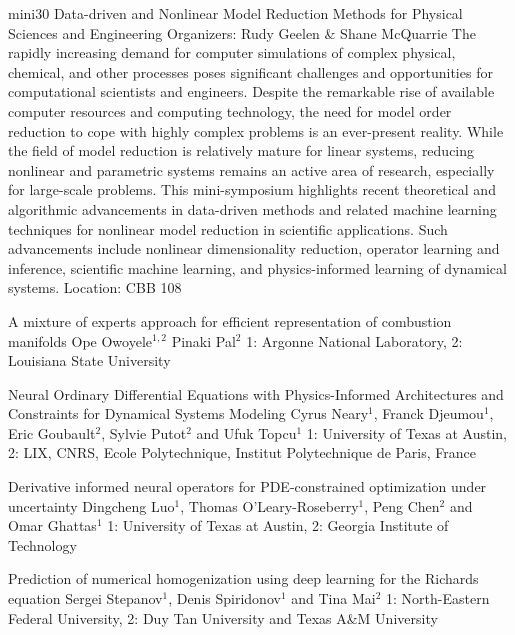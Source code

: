\mini
{mini30}
{Data-driven and Nonlinear Model Reduction Methods for Physical Sciences and Engineering}
{Organizers: Rudy Geelen \& Shane McQuarrie}
{The rapidly increasing demand for computer simulations of complex physical, chemical, and other processes poses significant challenges and opportunities for computational scientists and engineers. Despite the remarkable rise of available computer resources and computing technology, the need for model order reduction to cope with highly complex problems is an ever-present reality. While the field of model reduction is relatively mature for linear systems, reducing nonlinear and parametric systems remains an active area of research, especially for large-scale problems. This mini-symposium highlights recent theoretical and algorithmic advancements in data-driven methods and related machine learning techniques for nonlinear model reduction in scientific applications. Such advancements include nonlinear dimensionality reduction, operator learning and inference, scientific machine learning, and physics-informed learning of dynamical systems.}
{Location: CBB 108}

\begin{talks}
\item\talk
{A mixture of experts approach for efficient representation of combustion manifolds}
{Ope Owoyele$^{1,2}$ Pinaki Pal$^2$}
{1: Argonne National Laboratory, 2: Louisiana State University}
\item\talk
{Neural Ordinary Differential Equations with Physics-Informed Architectures and Constraints for Dynamical Systems Modeling}
{Cyrus Neary$^1$, Franck Djeumou$^1$, Eric Goubault$^2$, Sylvie Putot$^2$ and Ufuk Topcu$^1$}
{1: University of Texas at Austin, 2: LIX, CNRS, Ecole Polytechnique, Institut Polytechnique de Paris, France}
\item\talk
{Derivative informed neural operators for PDE-constrained optimization under uncertainty}
{Dingcheng Luo$^1$, Thomas O'Leary-Roseberry$^1$, Peng Chen$^2$ and Omar Ghattas$^1$}
{1: University of Texas at Austin, 2: Georgia Institute of Technology}
\item\talk
{Prediction of numerical homogenization using deep learning for the Richards equation}
{Sergei Stepanov$^1$, Denis Spiridonov$^1$ and Tina Mai$^2$}
{1: North-Eastern Federal University, 2: Duy Tan University and Texas A\&M University}
\end{talks}
\room
